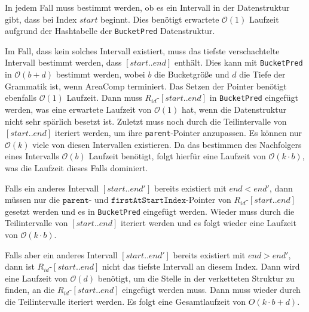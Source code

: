 In jedem Fall muss bestimmt werden, ob es ein Intervall in der Datenstruktur gibt, dass bei Index $start$ beginnt. Dies benötigt erwartete $\mathcal{O}(1)$ Laufzeit aufgrund der Hashtabelle der \texttt{BucketPred} Datenstruktur. 

Im Fall, dass kein solches Intervall existiert, muss das tiefste verschachtelte Intervall bestimmt werden, dass $[start..end]$ enthält. Dies kann mit \texttt{BucketPred} in $\mathcal{O}(b + d)$ bestimmt werden, wobei $b$ die Bucketgröße und $d$ die Tiefe der Grammatik ist, wenn AreaComp terminiert. Das Setzen der Pointer benötigt ebenfalls $\mathcal{O}(1)$ Laufzeit. 
Dann muss $R_{id}$-$[start..end]$ in \texttt{BucketPred} eingefügt werden, was eine erwartete Laufzeit von $\mathcal{O}(1)$ hat, wenn die Datenstruktur nicht sehr spärlich besetzt ist. Zuletzt muss noch durch die Teilintervalle von $[start..end]$ iteriert werden, um ihre \texttt{parent}-Pointer anzupassen. Es können nur $\mathcal{O}(k)$ viele von diesen Intervallen existieren. Da das bestimmen des Nachfolgers eines Intervalls $\mathcal{O}(b)$ Laufzeit benötigt, folgt hierfür eine Laufzeit von $\mathcal{O}(k \cdot b)$, was die Laufzeit dieses Falls dominiert.

Falls ein anderes Intervall $[start..end']$ bereits existiert mit $end < end'$, dann müssen nur die $\texttt{parent}$- und $\texttt{firstAtStartIndex}$-Pointer von $R_{id}$-$[start..end]$ gesetzt werden und es in \texttt{BucketPred} eingefügt werden. Wieder muss durch die Teilintervalle von $[start..end]$ iteriert werden und es folgt wieder eine Laufzeit von $\mathcal{O}(k \cdot b)$.

Falls aber ein anderes Intervall $[start..end']$ bereits existiert mit $end > end'$, dann ist $R_{id}$-$[start..end]$ nicht das tiefste Intervall an diesem Index. Dann wird eine Laufzeit von $\mathcal{O}(d)$ benötigt, um die Stelle in der verketteten Struktur zu finden, an die $R_{id}$-$[start..end]$ eingefügt werden muss. Dann muss wieder durch die Teilintervalle iteriert werden.
Es folgt eine Gesamtlaufzeit von ${O}(k \cdot b + d)$.